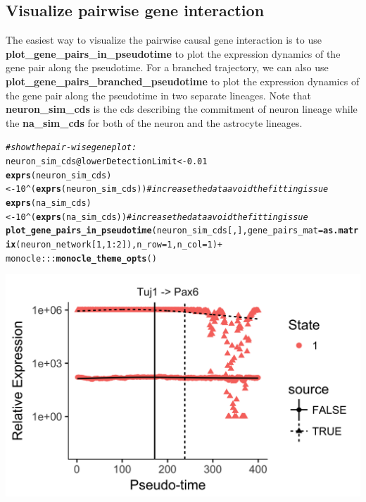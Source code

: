 \documentclass[10pt,oneside]{article}\usepackage[]{graphicx}\usepackage[]{color}
\makeatletter
\def\maxwidth{ %
  \ifdim\Gin@nat@width>\linewidth
    \linewidth
  \else
    \Gin@nat@width
  \fi
}
\newcommand{\hlnum}[1]{\textcolor[rgb]{0.686,0.059,0.569}{#1}}%
\newcommand{\hlcom}[1]{\textcolor[rgb]{0.678,0.584,0.686}{\textit{#1}}}%
\newcommand{\hlopt}[1]{\textcolor[rgb]{0,0,0}{#1}}%
\newcommand{\hlstd}[1]{\textcolor[rgb]{0.345,0.345,0.345}{#1}}%
\newcommand{\hlkwb}[1]{\textcolor[rgb]{0.69,0.353,0.396}{#1}}%
\newcommand{\hlkwc}[1]{\textcolor[rgb]{0.333,0.667,0.333}{#1}}%
\newcommand{\hlkwd}[1]{\textcolor[rgb]{0.737,0.353,0.396}{\textbf{#1}}}%
\newenvironment{kframe}{%
 \def\at@end@of@kframe{}%
 \ifinner\ifhmode%
  \def\at@end@of@kframe{\end{minipage}}%
  \begin{minipage}{\columnwidth}%
 \fi\fi%
 \def\FrameCommand##1{\hskip\@totalleftmargin \hskip-\fboxsep
 \colorbox{shadecolor}{##1}\hskip-\fboxsep
     \hskip-\linewidth \hskip-\@totalleftmargin \hskip\columnwidth}%
 \MakeFramed {\advance\hsize-\width
   \@totalleftmargin\z@ \linewidth\hsize
   \@setminipage}}%
 {\par\unskip\endMakeFramed%
 \at@end@of@kframe}
\newenvironment{knitrout}{}{} %
\makeatother
\begin{document}
\subsection{Visualize pairwise gene interaction}

The easiest way to visualize the pairwise causal gene interaction is to use \textbf{plot\_gene\_pairs\_in\_pseudotime} to plot the expression dynamics of the gene pair along the pseudotime. For a branched trajectory, we can also use \textbf{plot\_gene\_pairs\_branched\_pseudotime} to plot the expression dynamics of the gene pair along the pseudotime in two separate lineages. Note that \textbf{neuron\_sim\_cds} is the cds describing the commitment of neuron lineage while the \textbf{na\_sim\_cds} for both of the neuron and the astrocyte lineages. 
\begin{knitrout}
\color{fgcolor}\begin{kframe}
\begin{alltt}
\hlcom{# show the pair-wise gene plot:   }
\hlstd{neuron_sim_cds}\hlopt{@}\hlkwc{lowerDetectionLimit} \hlkwb{<-} \hlnum{0.01}
\hlkwd{exprs}\hlstd{(neuron_sim_cds)} \hlkwb{<-} \hlnum{10}\hlopt{^}\hlstd{(}\hlkwd{exprs}\hlstd{(neuron_sim_cds))} \hlcom{#increase the data avoid the fitting issue}
\hlkwd{exprs}\hlstd{(na_sim_cds)} \hlkwb{<-} \hlnum{10}\hlopt{^}\hlstd{(}\hlkwd{exprs}\hlstd{(na_sim_cds))} \hlcom{#increase the data avoid the fitting issue}
\hlkwd{plot_gene_pairs_in_pseudotime}\hlstd{(neuron_sim_cds[, ],} \hlkwc{gene_pairs_mat} \hlstd{=}  \hlkwd{as.matrix}\hlstd{(neuron_network[}\hlnum{1}\hlstd{,} \hlnum{1}\hlopt{:}\hlnum{2}\hlstd{]),} \hlkwc{n_row} \hlstd{=} \hlnum{1}\hlstd{,} \hlkwc{n_col} \hlstd{=} \hlnum{1}\hlstd{)} \hlopt{+}
  \hlstd{monocle}\hlopt{:::}\hlkwd{monocle_theme_opts}\hlstd{()}
\end{alltt}


{\ttfamily\noindent\itshape\color{messagecolor}{\#\# gene\_name is Pax6}}

{\ttfamily\noindent\itshape\color{messagecolor}{\#\# inflection\_point is 171.5}}

{\ttfamily\noindent\itshape\color{messagecolor}{\#\# gene\_name is Tuj1}}

{\ttfamily\noindent\itshape\color{messagecolor}{\#\# inflection\_point is 238}}\end{kframe}

{\centering \includegraphics[width=\maxwidth]{figure/gene_pairwise_kinetic_plot-1} 

}
\end{knitrout}
\end{document}
